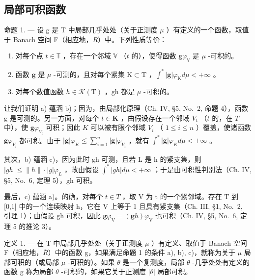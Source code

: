 \subsection{局部可积函数}

命题 1. --- 设 g 是 T 中局部几乎处处（关于正测度 \(\mu\) ）有定义的一个函数，取值于 Banach 空间 F（相应地，\(\overline{R}\)）中。下列性质等价：

\begin{enumerate}
\def\labelenumi{\alph{enumi})}
\item
  对每个点 \(t \in \mathbb{T}\) ，存在一个邻域 \(\mathbb{V}\) （\(t\) 的），使得函数 \(\mathbf{g}\varphi_{\mathbb{V}}\) 是 \(\mu\) -可积的。
\item
  函数 \(\mathbf{g}\) 是 \(\mu\) -可测的，且对每个紧集 \(\mathrm{K} \subset \mathrm{T}\) ，\(\int^{*} |\mathbf{g}| \varphi_{\mathrm{K}} d\mu < +\infty\) 。
\item
  对每个数值函数 \(h \in \mathcal{K}(\mathrm{T})\) ，gh 都是 \(\mu\) -可积的。
\end{enumerate}

让我们证明 a) 蕴涵 b)；因为，由局部化原理（Ch. IV, §5, No.~2, 命题 4），函数 g 是可测的。另一方面，对每个 \(t \in \mathbf{K}\) ，由假设存在一个邻域 \(V_t\) （\(t\) 的，在 \(T\) 中），使 \(\mathbf{g}\varphi_{V_t}\) 可积；因此 \(K\) 可以被有限个邻域 \(V_i\) （ \(1 \leqslant i \leqslant n\) ）覆盖，使诸函数 \(\mathbf{g}\varphi_{V_i}\) 都可积。由于 \(|\mathbf{g}| \varphi_K \leqslant \sum_{i=1}^{n} |\mathbf{g}| \varphi_{V_i}\) ，就有 \(\int^* |\mathbf{g}| \varphi_K d\mu < +\infty\) 。

其次，b) 蕴涵 c)，因为此时 gh 可测，且若 L 是 h 的紧支集，则 \(|gh| \leqslant \|h\|\cdot|g|\varphi_{L}\) ，故由假设 \(\int^{*}|gh|d\mu < +\infty\) ；于是由可积性判别法（Ch. IV, §5, No.~6, 定理 5），gh 可积。

最后，c) 蕴涵 a)。的确，对每个 \(t \in T\) ，取 V 为 t 的一个紧邻域。存在 T 到 {[}0,1{]} 中的一个连续映射 h，它在 V 上等于 1 且具有紧支集（Ch. III, §1, No.~2, 引理 1）；由假设 gh 可积，因此 \(\mathbf{g}\varphi_{\mathrm{V}} = (\mathbf{g}h)\varphi_{\mathrm{V}}\) 也可积（Ch. IV, §5, No.~6, 定理 5 的推论 3）。

定义 1. --- 在 T 中局部几乎处处（关于正测度 \(\mu\) ）有定义、取值于 Banach 空间 F（相应地，\(\overline{R}\)）中的函数 g，如果满足命题 1 的条件 a), b), c)，就称为关于 \(\mu\) 局部可积的（或局部 \(\mu\) -可积的）。如果 \(\theta\) 是一个复测度，局部 \(\theta\) -几乎处处有定义的函数 g 称为局部 \(\theta\) -可积的，如果它关于正测度 \(|\theta|\) 局部可积。

